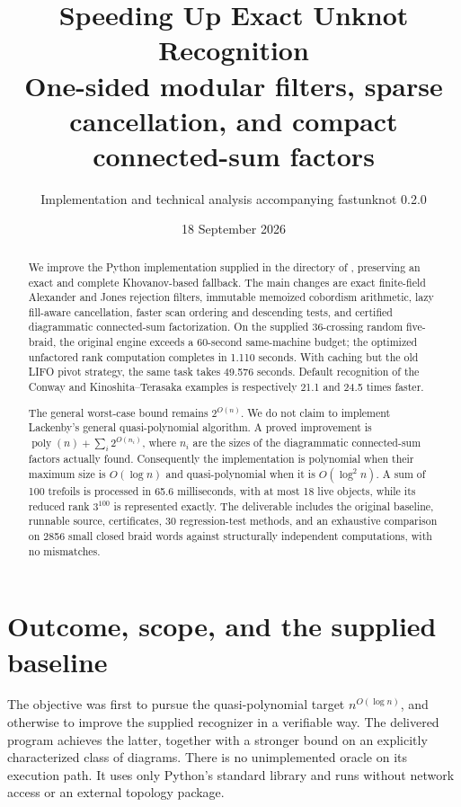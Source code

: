 \documentclass[11pt,letterpaper]{article}
\title{Speeding Up Exact Unknot Recognition\\[4pt]
\large One-sided modular filters, sparse cancellation, and compact connected-sum factors}
\author{Implementation and technical analysis accompanying fastunknot 0.2.0}
\date{18 September 2026}
\theoremstyle{definition}\newtheorem{definition}[theorem]{Definition}
\theoremstyle{remark}\newtheorem{remark}[theorem]{Remark}
\newcommand{\poly}{\operatorname{poly}}
\newcommand{\code}[1]{\texttt{\detokenize{#1}}}
\begin{document}
\maketitle
\begin{abstract}
We improve the Python implementation supplied in the \code{fast/} directory of
\code{Knots.zip}, preserving an exact and complete Khovanov-based fallback.
The main changes are exact finite-field Alexander and Jones rejection filters,
immutable memoized cobordism arithmetic, lazy fill-aware cancellation, faster
scan ordering and descending tests, and certified diagrammatic connected-sum
factorization. On the supplied 36-crossing random five-braid, the original
engine exceeds a 60-second same-machine budget; the optimized unfactored rank
computation completes in 1.110 seconds. With caching but the old LIFO pivot
strategy, the same task takes 49.576 seconds. Default recognition of the Conway
and Kinoshita--Terasaka examples is respectively 21.1 and 24.5 times faster.

The general worst-case bound remains $2^{O(n)}$. We do not claim to implement
Lackenby's general quasi-polynomial algorithm. A proved improvement is
$\poly(n)+\sum_i 2^{O(n_i)}$, where $n_i$ are the sizes of the diagrammatic
connected-sum factors actually found. Consequently the implementation is
polynomial when their maximum size is $O(\log n)$ and quasi-polynomial when it is
$O(\log^2 n)$. A sum of 100 trefoils is processed in 65.6 milliseconds, with at
most 18 live objects, while its reduced rank $3^{100}$ is represented exactly.
The deliverable includes the original baseline, runnable source, certificates,
30 regression-test methods, and an exhaustive comparison on 2856 small closed
braid words against structurally independent computations, with no mismatches.
\end{abstract}
\newpage
\setcounter{tocdepth}{2}
{\small\tableofcontents}
\newpage

\section{Outcome, scope, and the supplied baseline}

The objective was first to pursue the quasi-polynomial target
$n^{O(\log n)}$, and otherwise to improve the supplied recognizer in a verifiable
way. The delivered program achieves the latter, together with a stronger bound
on an explicitly characterized class of diagrams. There is no unimplemented
oracle on its execution path. It uses only Python's standard library and runs
without network access or an external topology package.
\end{document}
